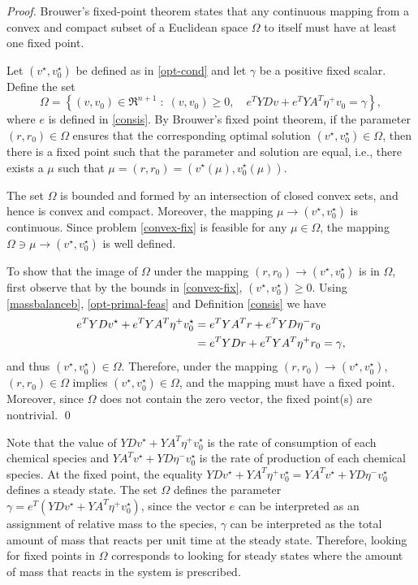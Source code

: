 \documentclass[smallextended]{svjour3}       %
\newcommand*{\0}{\mathbf{0}}
\newcommand*{\1}{\mathbf{1}}
\begin{document}
\begin{proof} 
	Brouwer's fixed-point theorem states that any continuous mapping from a
	convex and compact subset of a Euclidean space $\Omega$ to itself must have
	at least one fixed point. 

	Let $(v^\star,v^\star_0)$ be defined as in \eqref{opt-cond} and let $\gamma$
	be a positive fixed scalar. Define the set 
	\[
	\Omega = \left\{ (v,v_0)\in	\Re^{n+1} \; : \; (v,v_0)\geq 0, 
		\quad e^TYDv + e^TYA^T\eta^+v_0 = \gamma\right\},
	\]  
	where $e$ is defined in \eqref{consis}.  By Brouwer's fixed point
	theorem, if the parameter $(r,r_0) \in \Omega$ ensures that the corresponding 
    optimal solution $(v^\star,v_0^\star) \in \Omega$, then there is a fixed point 
    such that the parameter and solution are equal, i.e., there exists a $\mu$ 
    such that $\mu = (r,r_0) = (v^\star(\mu),v_0^\star(\mu))$.  

	The set $\Omega$ is bounded and formed by an intersection of closed convex
	sets, and hence is convex and compact.  Moreover, the mapping $\mu\rightarrow
	(v^\star,v^\star_0)$ is continuous. Since problem \eqref{convex-fix} is
	feasible for any $\mu\in\Omega$, the mapping $\Omega \ni \mu \rightarrow
	(v^\star,v^\star_0)$ is well defined.

	To show that the image of $\Omega$ under the mapping $(r,r_0) \rightarrow
	(v^\star,v_0^\star)$	is in $\Omega$, first observe that by the bounds in
    \eqref{convex-fix}, $(v^\star,v^\star_0) \ge 0$.  Using \eqref{massbalanceb}, 
    \eqref{opt-primal-feas} and Definition \ref{consis}
	we have
	\begin{align}
	e^T YD v^\star + e^T YA^T \eta^+ v^\star_0 &= e^T YA^T r + e^T YD \eta^- r_0 \notag 
	\\ & = e^T YD r + e^T YA^T \eta^+r_0=\gamma, \notag 
	\end{align} 
	and thus $(v^\star,v_0^\star)\in \Omega.$
	Therefore, under the mapping $(r,r_0) \rightarrow (v^\star,v_0^\star)$,
	$(r,r_0) \in \Omega$ implies $(v^\star,v^\star_0) \in \Omega$, and the
	mapping must have a fixed point.  Moreover, since $\Omega$ does not contain
	the zero vector, the fixed point(s) are nontrivial.
    \qed
\end{proof}

Note that the value of $YDv^\star+YA^T\eta^+v^\star_0$ is the rate of
consumption of each chemical species and $YA^Tv^\star+YD\eta^-v^\star_0$ is the
rate of production of each chemical species. At the fixed point, the equality
$YDv^\star + YA^T\eta^+v^\star_0= YA^Tv^\star+YD\eta^-v^\star_0$ defines a
steady state. The set $\Omega$ defines the parameter $\gamma=e^T(YDv^\star +
YA^T\eta^+v^\star_0)$, since the vector $e$ can be interpreted as an assignment
of relative mass to the species, $\gamma$ can be interpreted as the total
amount of mass that reacts per unit time at the steady state.  Therefore,
looking for fixed points in $\Omega$ corresponds to looking for steady states
where the amount of mass that reacts in the system is prescribed.
\end{document}
